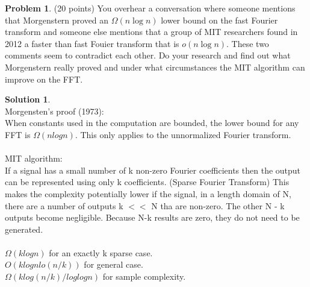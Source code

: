 \documentclass{article}
\theoremstyle{definition}
\newtheorem{problem}{Problem}
\newtheorem*{solution}{Solution}
\begin{document}
\begin{problem} (20 points) You overhear a conversation where someone
  mentions that Morgenstern proved an $\Omega(n\log n)$ lower bound on
  the fast Fourier transform and someone else mentions that a group of
  MIT researchers found in 2012 a faster than fast Fouier transform
  that is $o(n\log n)$. These two comments seem to contradict each
  other. Do your research and find out what Morgenstern really proved
  and under what circumstances the MIT algorithm can improve on the
  FFT.
\end{problem}
\begin{solution} \\
Morgensten's proof (1973): \\
When constants used in the computation are bounded, the lower bound for any FFT is $\Omega(n log n)$. This only applies to the unnormalized Fourier transform.\\
\\
MIT algorithm:\\
If a signal has a small number of k non-zero Fourier coefficients then the output can be represented using only k coefficients. (Sparse Fourier Transform) This makes the complexity potentially lower if the signal, in a length domain of N, there are a number of outputs k $<<$ N tha are non-zero. The other N - k outputs become negligible. Because N-k results are zero, they do not need to be generated. \\
\\
$\Omega(klogn)$ for an exactly k sparse case.\\
$O(klognlo(n/k))$ for general case.\\
$\Omega(klog(n/k) / loglogn)$ for sample complexity.\\



\end{solution}

\newpage
\end{document}
